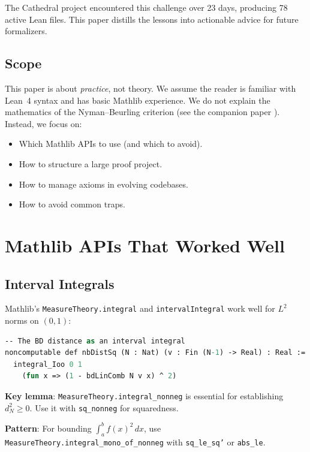 \documentclass[11pt,a4paper]{article}
\newcommand{\lean}[1]{\texttt{#1}}
\begin{document}
The Cathedral project encountered this challenge over 23 days,
producing 78 active Lean files. This paper distills the lessons
into actionable advice for future formalizers.

\subsection{Scope}

This paper is about \emph{practice}, not theory. We assume the reader
is familiar with Lean~4 syntax and has basic Mathlib experience. We
do not explain the mathematics of the Nyman--Beurling criterion
(see the companion paper \cite{cathedral-math}). Instead, we focus on:

\begin{itemize}
  \item Which Mathlib APIs to use (and which to avoid).
  \item How to structure a large proof project.
  \item How to manage axioms in evolving codebases.
  \item How to avoid common traps.
\end{itemize}

\section{Mathlib APIs That Worked Well}
\label{sec:good-apis}

\subsection{Interval Integrals}

Mathlib's \lean{MeasureTheory.integral} and
\lean{intervalIntegral} work well for $L^2$ norms on $(0,1)$:

\begin{lstlisting}[language=ML,caption={L2 norm on (0,1)}]
-- The BD distance as an interval integral
noncomputable def nbDistSq (N : Nat) (v : Fin (N-1) -> Real) : Real :=
  integral_Ioo 0 1
    (fun x => (1 - bdLinComb N v x) ^ 2)
\end{lstlisting}

\textbf{Key lemma}: \lean{MeasureTheory.integral\_nonneg} is
essential for establishing $d_N^2 \geq 0$. Use it with
\lean{sq\_nonneg} for squaredness.

\textbf{Pattern}: For bounding $\int_a^b f(x)^2\,dx$, use
\lean{MeasureTheory.integral\_mono\_of\_nonneg} with
\lean{sq\_le\_sq'} or \lean{abs\_le}.
\end{document}
